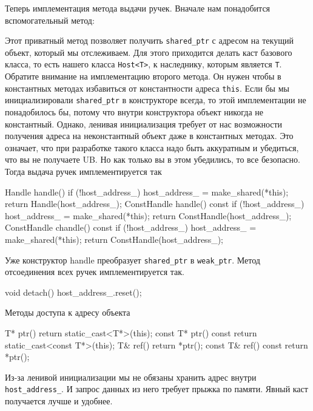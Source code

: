 Теперь имплементация метода выдачи ручек.
Вначале нам понадобится вспомогательный метод:
\begin{cppcode}
static shared_ptr<T*> sharedOn(Host& host) {
  return make_shared(static_cast<T*>(&host)); } // Downcast
};
static shared_ptr<T*> sharedOn(const Host& host) {
  return make_shared(static_cast<T*>(&const_cast<Host&>(host))); } // Downcast
};
\end{cppcode}
Этот приватный метод позволяет получить \verb"shared_ptr" с адресом на текущий объект, который мы отслеживаем.
Для этого приходится делать каст базового класса, то есть нашего класса \verb"Host<T>", к наследнику, которым является \verb"T".
Обратите внимание на имплементацию второго метода.
Он нужен чтобы в константных методах избавиться от константности адреса \verb"this".
Если бы мы инициализировали \verb"shared_ptr" в конструкторе всегда, то этой имплементации не понадобилось бы, потому что внутри конструктора объект никогда не константный.
Однако, ленивая инициализация требует от нас возможности получения адреса на неконстантный объект даже в константных методах.
Это означает, что при разработке такого класса надо быть аккуратным и убедиться, что вы не получаете UB.
Но как только вы в этом убедились, то все безопасно.
Тогда выдача ручек имплементируется так
\begin{cppcode}
Handle handle() {
  if (!host_address_)
    host_address_ = make_shared(*this);
  return Handle(host_address_);
}
ConstHandle handle() const {
  if (!host_address_)
    host_address_ = make_shared(*this);
  return ConstHandle(host_address_);
}
ConstHandle chandle() const {
  if (!host_address_)
    host_address_ = make_shared(*this);
  return ConstHandle(host_address_);
}
\end{cppcode}
Уже конструктор handle преобразует \verb"shared_ptr" в \verb"weak_ptr".
Метод отсоединения всех ручек имплементируется так.
\begin{cppcode}
void detach() {
  host_address_.reset();
}
\end{cppcode}
Методы доступа к адресу объекта
\begin{cppcode}
  T* ptr() {
    return static_cast<T*>(this);
  }
  const T* ptr() const {
    return static_cast<const T*>(this);
  }
  T& ref() {
    return *ptr();
  }
  const T& ref() const {
    return *ptr();
  }  
\end{cppcode}
Из-за ленивой инициализации мы не обязаны хранить адрес внутри \verb"host_address_".
И запрос данных из него требует прыжка по памяти.
Явный каст получается лучше и удобнее.

